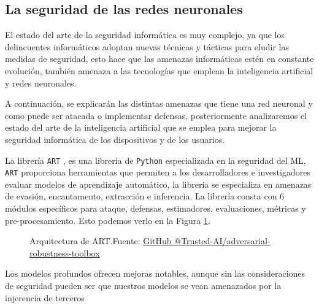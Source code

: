 \subsection{La seguridad de las redes neuronales} 
\label{ch:2:section:state-of-the-art:computer-security-in-neural-networks}

El estado del arte de la seguridad informática es muy complejo, ya que los delincuentes informáticos adoptan nuevas técnicas y tácticas para eludir las medidas de seguridad, esto hace que las amenazas informáticas estén en constante evolución, también amenaza a las tecnologías que emplean la inteligencia artificial y redes neuronales.

A continuación, se explicarán las distintas amenazas que tiene una red neuronal y como puede ser atacada o implementar defensas, posteriormente analizaremos el estado del arte de la inteligencia artificial que se emplea para mejorar la seguridad informática de los dispositivos y de los usuarios.

La librería \texttt{ART} \cite{art2018}, es una librería de \texttt{Python} especializada en la seguridad del \gls{ML}, \texttt{ART} proporciona herramientas que permiten a los desarrolladores e investigadores evaluar modelos de aprendizaje automático, la librería se especializa en amenazas de evasión, encantamento, extracción e inferencia. La librería consta con 6 módulos específicos para ataque, defensas, estimadores, evaluaciones, métricas y pre-procesamiento. Esto podemos verlo en la Figura \ref{fig:art-architecture}.

\begin{figure}[H]
    \centering
    \centerline{}
    \caption{Arquitectura de ART.\newline{}Fuente: \href{https://github.com/Trusted-AI/adversarial-robustness-toolbox/wiki/ART-Architecture-and-Roadmap}{GitHub @Trusted-AI/adversarial-robustness-toolbox}}
    \label{fig:art-architecture}
\end{figure}

Los modelos profundos ofrecen mejoras notables, aunque sin las consideraciones de seguridad pueden ser que nuestros modelos se vean amenazados por la injerencia de terceros

